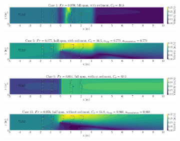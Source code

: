 \documentclass[preview, border=2pt]{standalone}
\begin{document}
\begin{figure}
     \centering
     \begin{subfigure}[b]{0.95\textwidth}
         \centering
         \caption{}
         \includegraphics[width=\textwidth]{exp_vel_mag_contour_Cd_0001.png}
     \end{subfigure}
     \hfill     
     \begin{subfigure}[b]{0.95\textwidth}
         \centering
         \caption{}
         \includegraphics[width=\textwidth]{exp_vel_mag_contour_Cd_0005.png}
     \end{subfigure}
     \hfill     
     \begin{subfigure}[b]{0.95\textwidth}
         \centering
         \caption{}
         \includegraphics[width=\textwidth]{exp_vel_mag_contour_Cd_0009.png}
     \end{subfigure}
     \hfill     
     \begin{subfigure}[b]{0.95\textwidth}
         \centering
         \caption{}
         \includegraphics[width=\textwidth]{exp_vel_mag_contour_Cd_0013.png}
     \end{subfigure}     
\end{figure}
\end{document}
